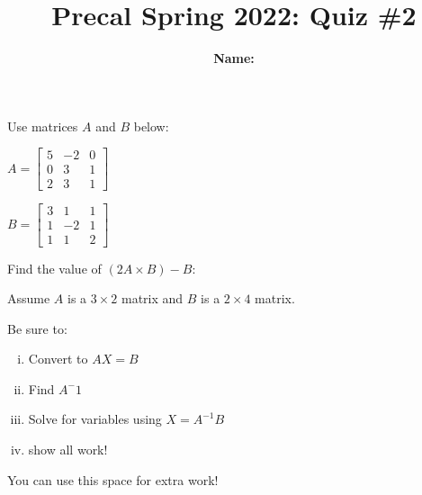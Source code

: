\documentclass{exam}
\title{Precal Spring 2022: Quiz \#2}
\author{\textbf{Name: }  \enspace\hrulefill}
\begin{document}
\maketitle
\begin{questions}
\question
Use matrices $A$ and $B$ below:
\begin{multicols}{2}
$
A = 

\begin{bmatrix}
5 &  -2 & 0 \\
0 & 3 & 1\\
2 & 3 & 1
\end{bmatrix}
$
\columnbreak

$
B = 

\begin{bmatrix}
3 & 1 & 1\\
1 & -2 & 1\\
1 & 1 & 2
\end{bmatrix}
$

\end{multicols}
Find the value of $(2A\times B) - B$:


\newpage



\question
Assume $A$ is a $3\times 2$ matrix and $B$ is a $2 \times 4$ matrix.


\question
{}

Be sure to:
\begin{enumerate}[i.]
\item Convert to $AX=B$
\item Find $A^-1$
\item Solve for variables using $X=A^{-1}B$
\item show all work!
\end{enumerate}

\newpage

\end{questions}
You can use this space for extra work!


\newpage
\end{document}
